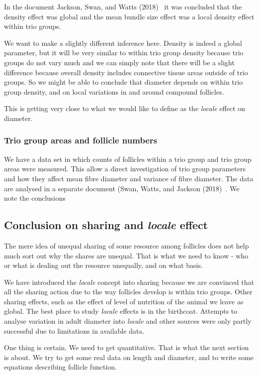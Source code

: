 \documentclass[titlepage]{article}  %
\begin{document}
In the document Jackson, Swan, and Watts (2018)~\cite{jack:18c}  it was concluded that the density effect was global and the mean bundle size effect was a local density effect within trio groups.

We want to make a slightly different inference here.  Density is indeed a global parameter, but it will be very similar to within trio group density because trio groups do not vary much and we can simply note that there will be a slight difference because overall density includes connective tissue areas outside of trio groups. So we might be able to conclude that diameter depends on within trio group density, and on local variations in and around compound follicles. 

This is getting very close to what we would like to define as the {\em locale} effect on diameter.

\subsubsection{Trio group areas and follicle numbers}
We have a data set in which counts of follicles within a trio group and trio group areas were measured. This allow a direct investigation of trio group parameters and how they affect mean fibre diameter and variance of fibre diameter. The data are analysed in a separate document (Swan, Watts, and Jackson (2018)~\cite{swan:18}. We note the conclusions


\subsection{Conclusion on sharing and {\em locale} effect}
The mere idea of unequal sharing of some resource among follicles does not help much sort out why the shares are unequal. That is what we need to know - who or what is dealing out the resource unequally, and on what basis.

We have introduced the {\em locale} concept into sharing because we are convinced that all the sharing action due to the way follicles develop is within trio groups. Other sharing effects, such as the effect of level of nutrition of the animal we leave as global. The best place to study {\em locale} effects is in the birthcoat. Attempts to analyse variation in adult diameter into {\em locale} and other sources were only partly successful due to limitations in available data.

One thing is certain. We need to get quantitative.  That is what the next section is about. We try to get some real data on length and diameter, and to write some equations describing follicle function.
\end{document}
